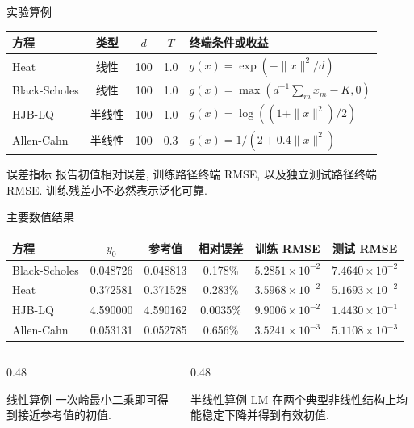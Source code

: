 \documentclass[aspectratio=169, 10pt, fontset=fandol]{ctexbeamer}
\begin{document}
\begin{frame}{实验算例}
  \begin{table}
    \centering
    \small
    \begin{tabular}{lcccl}
      \toprule
      方程 & 类型 & $d$ & $T$ & 终端条件或收益 \\
      \midrule
      Heat & 线性 & 100 & 1.0
        & $g(x)=\exp(-\|x\|^2/d)$\\
      Black-Scholes & 线性 & 100 & 1.0
        & $g(x)=\max(d^{-1}\sum_m x_m-K,0)$\\
      HJB-LQ & 半线性 & 100 & 1.0
        & $g(x)=\log((1+\|x\|^2)/2)$\\
      Allen-Cahn & 半线性 & 100 & 0.3
        & $g(x)=1/(2+0.4\|x\|^2)$\\
      \bottomrule
    \end{tabular}
  \end{table}

  \vspace{0.1cm}
  \begin{block}{误差指标}
    报告初值相对误差, 训练路径终端 RMSE, 以及独立测试路径终端 RMSE. 训练残差小不必然表示泛化可靠.
  \end{block}
\end{frame}

\begin{frame}{主要数值结果}
  \begin{table}
    \centering
    \small
    \begin{tabular}{lccccc}
      \toprule
      方程 & $y_0$ & 参考值 & 相对误差 & 训练 RMSE & 测试 RMSE \\
      \midrule
      Black-Scholes & 0.048726 & 0.048813 & 0.178\% & $5.2851{\times}10^{-2}$ & $7.4640{\times}10^{-2}$ \\
      Heat & 0.372581 & 0.371528 & 0.283\% & $3.5968{\times}10^{-2}$ & $5.1693{\times}10^{-2}$ \\
      HJB-LQ & 4.590000 & 4.590162 & 0.0035\% & $9.9006{\times}10^{-2}$ & $1.4430{\times}10^{-1}$ \\
      Allen-Cahn & 0.053131 & 0.052785 & 0.656\% & $3.5241{\times}10^{-3}$ & $5.1108{\times}10^{-3}$ \\
      \bottomrule
    \end{tabular}
  \end{table}

  \begin{columns}[T,onlytextwidth]
    \begin{column}{0.48\textwidth}
      \begin{block}{线性算例}
        一次岭最小二乘即可得到接近参考值的初值.
      \end{block}
    \end{column}
    \begin{column}{0.48\textwidth}
      \begin{block}{半线性算例}
        LM 在两个典型非线性结构上均能稳定下降并得到有效初值.
      \end{block}
    \end{column}
  \end{columns}
\end{frame}
\end{document}
